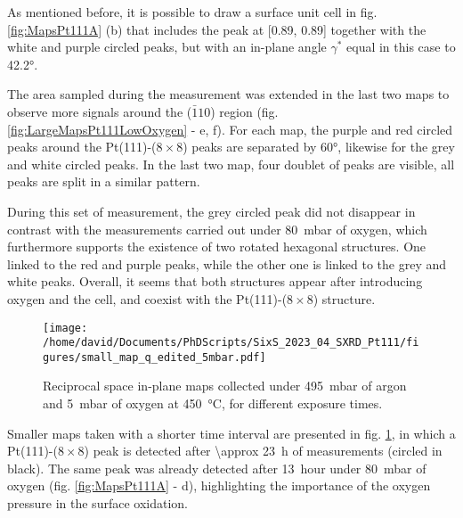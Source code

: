As mentioned before, it is possible to draw a surface unit cell in fig. \ref{fig:MapsPt111A} (b) that includes the peak at [0.89, 0.89] together with the white and purple circled peaks, but with an in-plane angle $\gamma^*$ equal in this case to \ang{42.2}.

The area sampled during the measurement was extended in the last two maps to observe more signals around the ($\bar{1}10$) region (fig. \ref{fig:LargeMapsPt111LowOxygen} - e, f).
For each map, the purple and red circled peaks around the Pt(111)-($8\times8$) peaks are separated by \ang{60}, likewise for the grey and white circled peaks.
In the last two map, four doublet of peaks are visible, all peaks are split in a similar pattern.

During this set of measurement, the grey circled peak did not disappear in contrast with the measurements carried out under \qty{80}{\milli\bar} of oxygen, which furthermore supports the existence of two rotated hexagonal structures.
One linked to the red and purple peaks, while the other one is linked to the grey and white peaks.
Overall, it seems that both structures appear after introducing oxygen and the cell, and coexist with the Pt(111)-($8\times8$) structure.

\begin{figure}[!htb]
    \centering
    \texttt{[image: /home/david/Documents/PhDScripts/SixS\_2023\_04\_SXRD\_Pt111/figures/small\_map\_q\_edited\_5mbar.pdf]}
    \caption{
        Reciprocal space in-plane maps collected under \qty{495}{\milli\bar} of argon and \qty{5}{\milli\bar} of oxygen at \qty{450}{\degreeCelsius}, for different exposure times.
    }
    \label{fig:SmallMapsPt111LowOxygen}
\end{figure}

Smaller maps taken with a shorter time interval are presented in fig. \ref{fig:SmallMapsPt111LowOxygen}, in which a Pt(111)-($8\times8$) peak is detected after \qty{\approx 23}{\hour} of measurements (circled in black).
The same peak was already detected after \qty{13}{hour} under \qty{80}{\milli\bar} of oxygen (fig. \ref{fig:MapsPt111A} - d), highlighting the importance of the oxygen pressure in the surface oxidation.

